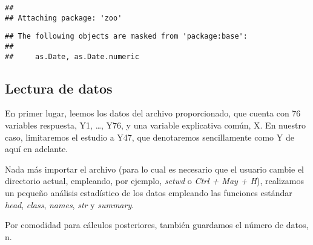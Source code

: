 \documentclass[
]{article}
\newenvironment{Shaded}{\begin{snugshade}}{\end{snugshade}}
\newcommand{\AttributeTok}[1]{\textcolor[rgb]{0.77,0.63,0.00}{#1}}
\newcommand{\CommentTok}[1]{\textcolor[rgb]{0.56,0.35,0.01}{\textit{#1}}}
\newcommand{\FunctionTok}[1]{\textcolor[rgb]{0.00,0.00,0.00}{#1}}
\newcommand{\NormalTok}[1]{#1}
\newcommand{\OtherTok}[1]{\textcolor[rgb]{0.56,0.35,0.01}{#1}}
\newcommand{\StringTok}[1]{\textcolor[rgb]{0.31,0.60,0.02}{#1}}
\begin{document}
\begin{verbatim}
## 
## Attaching package: 'zoo'
\end{verbatim}

\begin{verbatim}
## The following objects are masked from 'package:base':
## 
##     as.Date, as.Date.numeric
\end{verbatim}

\hypertarget{lectura-de-datos}{%
\subsection{Lectura de datos}\label{lectura-de-datos}}

En primer lugar, leemos los datos del archivo proporcionado, que cuenta
con 76 variables respuesta, Y1, \ldots, Y76, y una variable explicativa
común, X. En nuestro caso, limitaremos el estudio a Y47, que denotaremos
sencillamente como Y de aquí en adelante.

Nada más importar el archivo (para lo cual es necesario que el usuario
cambie el directorio actual, empleando, por ejemplo, \emph{setwd} o
\emph{Ctrl + May + H}), realizamos un pequeño análisis estadístico de
los datos empleando las funciones estándar \emph{head}, \emph{class},
\emph{names}, \emph{str} y \emph{summary}.

Por comodidad para cálculos posteriores, también guardamos el número de
datos, n.

\begin{Shaded}
\end{Shaded}
\end{document}
